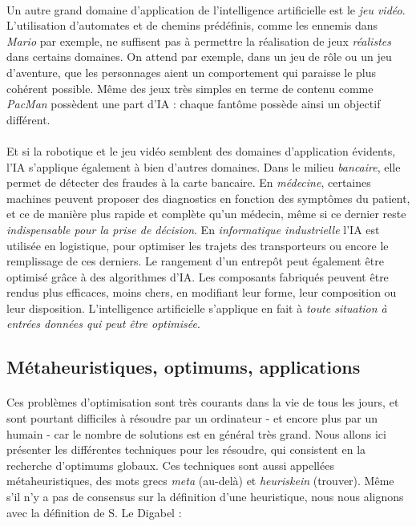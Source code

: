 \paragraph{} Un autre grand domaine d'application de l'intelligence artificielle est le \emph{jeu vidéo}. L'utilisation 
d'automates et de chemins prédéfinis, comme les ennemis dans \emph{Mario} par exemple, ne suffisent pas à permettre la réalisation
de jeux \emph{réalistes} dans certains domaines. On attend par exemple, dans un jeu de rôle ou un jeu d'aventure, que les
personnages aient un comportement qui paraisse le plus cohérent possible. Même des jeux très simples en terme de contenu
comme \emph{PacMan} possèdent une part d'IA : chaque fantôme possède ainsi un objectif différent.

\paragraph{} Et si la robotique et le jeu vidéo semblent des domaines d'application évidents, l'IA s'applique également
à bien d'autres domaines. Dans le milieu \emph{bancaire}, elle permet de détecter des fraudes à la carte bancaire. En
\emph{médecine}, certaines machines peuvent proposer des diagnostics en fonction des symptômes du patient, et ce de
manière plus rapide et complète qu'un médecin, même si ce dernier reste \emph{indispensable pour la prise de décision}.
En \emph{informatique industrielle} l'IA est utilisée en logistique, pour optimiser les trajets des transporteurs ou 
encore le remplissage de ces derniers. Le rangement d'un entrepôt peut également être optimisé grâce à des algorithmes d'IA.
Les composants fabriqués peuvent être rendus plus efficaces, moins chers, en modifiant leur forme, leur composition ou 
leur disposition. L'intelligence artificielle s'applique en fait à \emph{toute situation à entrées données qui peut
être optimisée}.

\subsection*{Métaheuristiques, optimums, applications}

\paragraph{} Ces problèmes d'optimisation sont très courants dans la vie de tous les jours, et sont pourtant
difficiles à résoudre par un ordinateur - et encore plus par un humain - car le nombre de solutions est en
général très grand. Nous allons ici présenter les différentes techniques pour les résoudre, qui consistent 
en la recherche d'optimums globaux. Ces techniques sont aussi appellées métaheuristiques, des mots grecs \emph{meta}
(au-delà) et \emph{heuriskein} (trouver). Même s'il n'y a pas de consensus sur la définition d'une heuristique, nous
nous alignons avec la définition de S. Le Digabel \cite{Metaheuristics0} :

